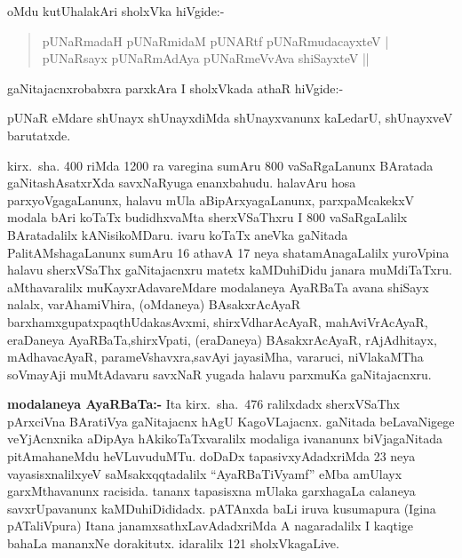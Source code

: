 oMdu kutUhalakAri sholxVka hiVgide:-
\begin{verse}
pUNaRmadaH pUNaRmidaM pUNARtf pUNaRmudacayxteV |\\
pUNaRsayx pUNaRmAdAya pUNaRmeVvAva shiSayxteV ||
\end{verse}
gaNitajacnxrobabxra parxkAra I sholxVkada athaR hiVgide:-

pUNaR eMdare shUnayx shUnayxdiMda shUnayxvanunx kaLedarU, shUnayxveV barutatxde.

kirx.~sha. {\rm 400} riMda {\rm 1200} ra varegina sumAru {\rm 800} vaSaRgaLanunx BAratada gaNita\-shAsatxrXda savxNaRyuga enanxbahudu. halavAru hosa parxyoVgagaLanunx, halavu mUla aBipArxyagaLanunx, parxpaMcakekxV modala bAri koTaTx budidhxvaMta sherxVSaThxru I {\rm 800} vaSaR\-gaLalilx BAratadalilx kANisikoMDaru. ivaru koTaTx aneVka gaNitada PalitAMshagaLanunx sumAru {\rm 16} athavA {\rm 17} neya shatamAnagaLalilx yuroVpina halavu sherxVSaThx gaNita\-jacnxru matetx kaMDuhiDidu janara muMdiTaTxru. aMthavaralilx muKayxrAdavareMdare modalaneya AyaRBaTa avana shiSayx nalalx, varAhamiVhira, (oMdaneya) BAsakxrAcAyaR barxhamxgupatx\break paqthUdakasAvxmi, shirxVdharAcAyaR, mahAviVrAcAyaR, eraDaneya AyaRBaTa,\break shirxVpati, (eraDaneya) BAsakxrAcAyaR, rAjAdhitayx, mAdhavacAyaR, parameVshavxra,\break savAyi jayasiMha, vararuci, niVlakaMTha soVmayAji muMtAdavaru savxNaR \-yugada halavu parxmuKa gaNitajacnxru.

\textbf{modalaneya AyaRBaTa:-} Ita kirx.~sha.~{\rm 476} ralilxdadx sherxVSaThx pArxciVna BAratiVya gaNitajacnx hAgU KagoVLajacnx. gaNitada beLavaNigege veYjAcnxnika aDipAya hAkikoTaTxvaralilx modaliga ivananunx biVjagaNitada pitAmahaneMdu heVLuvuduMTu. doDaDx tapasivxyAdadxriMda {\rm 23} neya vayasisxnalilxyeV saMsakxqqtadalilx ``AyaRBaTiVyamf'' eMba amUlayx garxMthavanunx racisida. tananx tapasisxna mUlaka garxhagaLa calaneya savxrUpavanunx kaMDuhiDididadx. pATAnxda baLi iruva kusumapura (Igina pATaliVpura) Itana janamxsathxLavAdadxriMda  A nagaradalilx I kaqtige bahaLa mananxNe dorakitutx. idaralilx {\rm 121} sholxVkagaLive.


